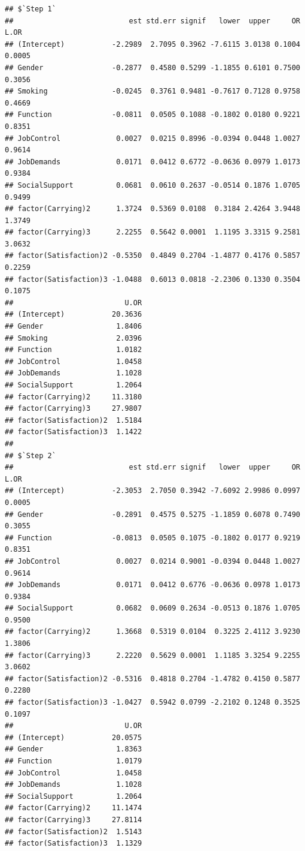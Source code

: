 \documentclass[
]{book}
\begin{document}
\begin{verbatim}
## $`Step 1`
##                           est std.err signif   lower  upper     OR   L.OR
## (Intercept)           -2.2989  2.7095 0.3962 -7.6115 3.0138 0.1004 0.0005
## Gender                -0.2877  0.4580 0.5299 -1.1855 0.6101 0.7500 0.3056
## Smoking               -0.0245  0.3761 0.9481 -0.7617 0.7128 0.9758 0.4669
## Function              -0.0811  0.0505 0.1088 -0.1802 0.0180 0.9221 0.8351
## JobControl             0.0027  0.0215 0.8996 -0.0394 0.0448 1.0027 0.9614
## JobDemands             0.0171  0.0412 0.6772 -0.0636 0.0979 1.0173 0.9384
## SocialSupport          0.0681  0.0610 0.2637 -0.0514 0.1876 1.0705 0.9499
## factor(Carrying)2      1.3724  0.5369 0.0108  0.3184 2.4264 3.9448 1.3749
## factor(Carrying)3      2.2255  0.5642 0.0001  1.1195 3.3315 9.2581 3.0632
## factor(Satisfaction)2 -0.5350  0.4849 0.2704 -1.4877 0.4176 0.5857 0.2259
## factor(Satisfaction)3 -1.0488  0.6013 0.0818 -2.2306 0.1330 0.3504 0.1075
##                          U.OR
## (Intercept)           20.3636
## Gender                 1.8406
## Smoking                2.0396
## Function               1.0182
## JobControl             1.0458
## JobDemands             1.1028
## SocialSupport          1.2064
## factor(Carrying)2     11.3180
## factor(Carrying)3     27.9807
## factor(Satisfaction)2  1.5184
## factor(Satisfaction)3  1.1422
## 
## $`Step 2`
##                           est std.err signif   lower  upper     OR   L.OR
## (Intercept)           -2.3053  2.7050 0.3942 -7.6092 2.9986 0.0997 0.0005
## Gender                -0.2891  0.4575 0.5275 -1.1859 0.6078 0.7490 0.3055
## Function              -0.0813  0.0505 0.1075 -0.1802 0.0177 0.9219 0.8351
## JobControl             0.0027  0.0214 0.9001 -0.0394 0.0448 1.0027 0.9614
## JobDemands             0.0171  0.0412 0.6776 -0.0636 0.0978 1.0173 0.9384
## SocialSupport          0.0682  0.0609 0.2634 -0.0513 0.1876 1.0705 0.9500
## factor(Carrying)2      1.3668  0.5319 0.0104  0.3225 2.4112 3.9230 1.3806
## factor(Carrying)3      2.2220  0.5629 0.0001  1.1185 3.3254 9.2255 3.0602
## factor(Satisfaction)2 -0.5316  0.4818 0.2704 -1.4782 0.4150 0.5877 0.2280
## factor(Satisfaction)3 -1.0427  0.5942 0.0799 -2.2102 0.1248 0.3525 0.1097
##                          U.OR
## (Intercept)           20.0575
## Gender                 1.8363
## Function               1.0179
## JobControl             1.0458
## JobDemands             1.1028
## SocialSupport          1.2064
## factor(Carrying)2     11.1474
## factor(Carrying)3     27.8114
## factor(Satisfaction)2  1.5143
## factor(Satisfaction)3  1.1329

\end{verbatim}
\end{document}
